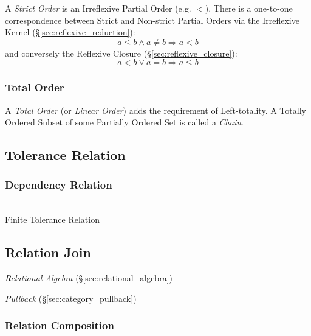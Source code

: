 A \emph{Strict Order} is an Irreflexive Partial Order (e.g. $<$).
There is a one-to-one correspondence between Strict and Non-strict
Partial Orders via the Irreflexive Kernel
(\S\ref{sec:reflexive_reduction}):
\[
  a \leq b \wedge a \neq b \Rightarrow a < b
\]
and conversely the Reflexive Closure (\S\ref{sec:reflexive_closure}):
\[
  a < b \vee a = b \Rightarrow a \leq b
\]



\subsubsection{Total Order}\label{sec:total_order}

A \emph{Total Order} (or \emph{Linear Order}) adds the requirement of
Left-totality. A Totally Ordered Subset of some Partially Ordered Set
is called a \emph{Chain}.




\subsection{Tolerance Relation}\label{sec:tolerance_relation}

\subsubsection{Dependency Relation}\label{sec:dependency_relation}
\hfill \\

Finite Tolerance Relation



\subsection{Relation Join}\label{sec:relation_join}

\emph{Relational Algebra} (\S\ref{sec:relational_algebra})

\emph{Pullback} (\S\ref{sec:category_pullback})



\subsubsection{Relation Composition}\label{sec:relation_composition}

